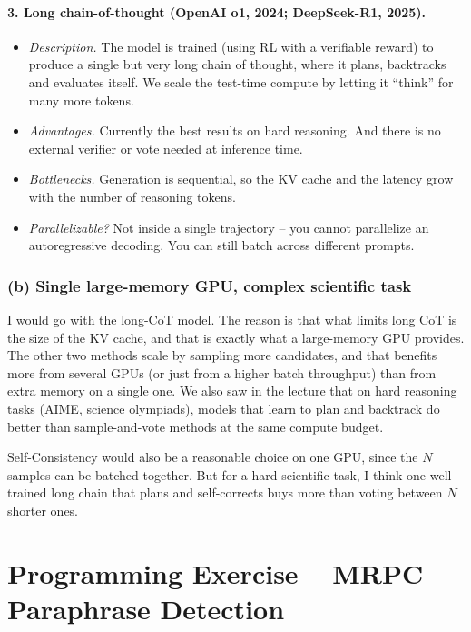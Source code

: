 \documentclass[11pt]{article}
\begin{document}
\paragraph{3. Long chain-of-thought (OpenAI o1, 2024; DeepSeek-R1, 2025).}
\begin{itemize}[leftmargin=*]
    \item \emph{Description.} The model is trained (using RL with a verifiable reward) to produce a single but very long chain of thought, where it plans, backtracks and evaluates itself. We scale the test-time compute by letting it ``think'' for many more tokens.
    \item \emph{Advantages.} Currently the best results on hard reasoning. And there is no external verifier or vote needed at inference time.
    \item \emph{Bottlenecks.} Generation is sequential, so the KV cache and the latency grow with the number of reasoning tokens.
    \item \emph{Parallelizable?} Not inside a single trajectory -- you cannot parallelize an autoregressive decoding. You can still batch across different prompts.
\end{itemize}

\subsubsection*{(b) Single large-memory GPU, complex scientific task}

I would go with the long-CoT model. The reason is that what limits long CoT is the size of the KV cache, and that is exactly what a large-memory GPU provides. The other two methods scale by sampling more candidates, and that benefits more from several GPUs (or just from a higher batch throughput) than from extra memory on a single one. We also saw in the lecture that on hard reasoning tasks (AIME, science olympiads), models that learn to plan and backtrack do better than sample-and-vote methods at the same compute budget.

Self-Consistency would also be a reasonable choice on one GPU, since the $N$ samples can be batched together. But for a hard scientific task, I think one well-trained long chain that plans and self-corrects buys more than voting between $N$ shorter ones.

\section{Programming Exercise -- MRPC Paraphrase Detection}
\end{document}
